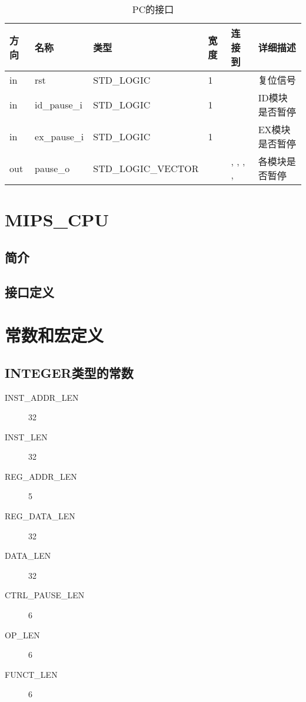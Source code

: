 \documentclass{article}
\begin{document}
\begin{table}
    \centering
    \begin{tabular}{llllp{2cm}p{2cm}}
    \toprule
    方向 & 名称 & 类型 & 宽度 & 连接到 & 详细描述 \\ \midrule
    in & rst\label{PAUSE_CTRL:rst} & STD_LOGIC & 1 & \nameref{sec:MIPS_CPU} & 复位信号 \\
    in & id_pause_i\label{PAUSE_CTRL:id_pause_i} & STD_LOGIC & 1 & \nameref{sec:ID} & ID模块是否暂停 \\
    in & ex_pause_i\label{PAUSE_CTRL:ex_pause_i} & STD_LOGIC & 1 & \nameref{sec:EX} & EX模块是否暂停 \\
    out & pause_o\label{PAUSE_CTRL:pause_o} & STD_LOGIC_VECTOR & \nameref{const:CTRL_PAUSE_LEN} & \nameref{sec:PC}, \nameref{sec:IF/ID}, \nameref{sec:ID/EX}, \nameref{sec:EX/MEM}, \nameref{sec:MEM/WB} & 各模块是否暂停 \\
    \bottomrule
    \end{tabular}
    \caption {PC的接口}
\end{table}
\FloatBarrier

\section{MIPS_CPU}
\label{sec:MIPS_CPU}

\subsection{简介}

\subsection{接口定义}

\appendix
\section{常数和宏定义}

\subsection{INTEGER类型的常数}

\begin{description}
  \item[INST_ADDR_LEN\label{const:INST_ADDR_LEN}] 32
  \item[INST_LEN\label{const:INST_LEN}] 32
  \item[REG_ADDR_LEN\label{const:REG_ADDR_LEN}] 5
  \item[REG_DATA_LEN\label{const:REG_DATA_LEN}] 32
  \item[DATA_LEN\label{const:DATA_LEN}] 32
  \item[CTRL_PAUSE_LEN\label{const:CTRL_PAUSE_LEN}] 6
  \item[OP_LEN\label{const:OP_LEN}] 6
  \item[FUNCT_LEN\label{const:FUNCT_LEN}] 6
\end{description}
\end{document}
